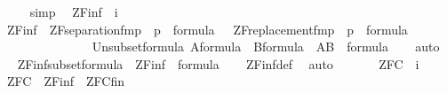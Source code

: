 \begin{isabellebody}
\ \ \ \ \isamarkupfalse%
\ simp\isanewline
{}\isamarkupfalse%
%
\endisatagproof
{\isafoldproof}%
%
\isadelimproof
\isanewline
%
\endisadelimproof
\isanewline
{}\isamarkupfalse%
\isanewline
\ \ ZF{\isacharunderscore}{\kern0pt}inf\ {\isacharcolon}{\kern0pt}{\isacharcolon}{\kern0pt}\ {\isachardoublequoteopen}i{\isachardoublequoteclose}\ \isanewline
\ \ {\isachardoublequoteopen}ZF{\isacharunderscore}{\kern0pt}inf\ {\isasymequiv}\ {\isacharbraceleft}{\kern0pt}ZF{\isacharunderscore}{\kern0pt}separation{\isacharunderscore}{\kern0pt}fm{\isacharparenleft}{\kern0pt}p{\isacharparenright}{\kern0pt}\ {\isachardot}{\kern0pt}\ p\ {\isasymin}\ formula\ {\isacharbraceright}{\kern0pt}\ {\isasymunion}\ {\isacharbraceleft}{\kern0pt}ZF{\isacharunderscore}{\kern0pt}replacement{\isacharunderscore}{\kern0pt}fm{\isacharparenleft}{\kern0pt}p{\isacharparenright}{\kern0pt}\ {\isachardot}{\kern0pt}\ p\ {\isasymin}\ formula\ {\isacharbraceright}{\kern0pt}{\isachardoublequoteclose}\isanewline
\ \ \ \ \ \ \ \ \ \ \ \ \ \ \isanewline
{}\isamarkupfalse%
\ Un{\isacharunderscore}{\kern0pt}subset{\isacharunderscore}{\kern0pt}formula{\isacharcolon}{\kern0pt}\ {\isachardoublequoteopen}A{\isasymsubseteq}formula\ {\isasymand}\ B{\isasymsubseteq}formula\ {\isasymLongrightarrow}\ A{\isasymunion}B\ {\isasymsubseteq}\ formula{\isachardoublequoteclose}\isanewline
%
\isadelimproof
\ \ %
\endisadelimproof
%
\isatagproof
{}\isamarkupfalse%
\ auto%
\endisatagproof
{\isafoldproof}%
%
\isadelimproof
\isanewline
%
\endisadelimproof
\ \ \isanewline
{}\isamarkupfalse%
\ ZF{\isacharunderscore}{\kern0pt}inf{\isacharunderscore}{\kern0pt}subset{\isacharunderscore}{\kern0pt}formula\ {\isacharcolon}{\kern0pt}\ {\isachardoublequoteopen}ZF{\isacharunderscore}{\kern0pt}inf\ {\isasymsubseteq}\ formula{\isachardoublequoteclose}\isanewline
%
\isadelimproof
\ \ %
\endisadelimproof
%
\isatagproof
{}\isamarkupfalse%
\ ZF{\isacharunderscore}{\kern0pt}inf{\isacharunderscore}{\kern0pt}def\ \isamarkupfalse%
\ auto%
\endisatagproof
{\isafoldproof}%
%
\isadelimproof
\isanewline
%
\endisadelimproof
\ \ \ \ \isanewline
{}\isamarkupfalse%
\isanewline
\ \ ZFC\ {\isacharcolon}{\kern0pt}{\isacharcolon}{\kern0pt}\ {\isachardoublequoteopen}i{\isachardoublequoteclose}\ \isanewline
\ \ {\isachardoublequoteopen}ZFC\ {\isasymequiv}\ ZF{\isacharunderscore}{\kern0pt}inf\ {\isasymunion}\ ZFC{\isacharunderscore}{\kern0pt}fin{\isachardoublequoteclose}\isanewline

\end{isabellebody}
